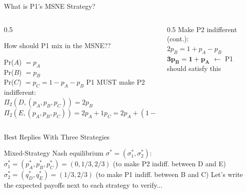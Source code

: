 \begin{frame}{What is P1's MSNE Strategy?}
\begin{columns}[T]
\begin{column}{0.5\textwidth}
\raggedright
How should P1 mix in the MSNE??
\centering
{}
\bsk
\raggedright
Pr($A$) $=p_A$\\
Pr($B$) $=p_B$\\
Pr($C$) $=p_C=1-p_A-p_B$
\bsk
P1 MUST make P2 indifferent:\\
$\Pi_2(D,(p_A,p_B,p_C))=2p_B$\\
$\Pi_2(E,(p_A,p_B,p_C))=2p_A+1p_C=2p_A+(1-p_A-p_B)=1+p_A-p_B$
\end{column}
\begin{column}{0.5\textwidth}
Make P2 indifferent (cont.):\\
$2p_B = 1+p_A-p_B$\\
$\mathbf{3p_B=1+p_A}$ \quad $\leftarrow$ P1 should satisfy this
\bsk
{}
\end{column}
\end{columns}
\end{frame}

\begin{frame}{Best Replies With Three Strategies}
\begin{center}
    \begin{matrixgame}[top={D, E}, left={A, B, C}, player names={Player 1, Player 2}]
\end{matrixgame}
\end{center}
\bsk
Mixed-Strategy Nash equilibrium $\sigma^*=(\sigma_1^*,\sigma_2^*)$:
\bsk
$\sigma_1^*=(p_A^*,p_B^*,p_C^*)=(0,1/3,2/3)$ (to make P2 indiff. between D and E)
\bsk
$\sigma_2^*=(q_D^*,q_E^*)=(1/3,2/3)$ (to make P1 indiff. between B and C)
\bsk
Let's write the expected payoffs next to each strategy to verify...
\end{frame}

